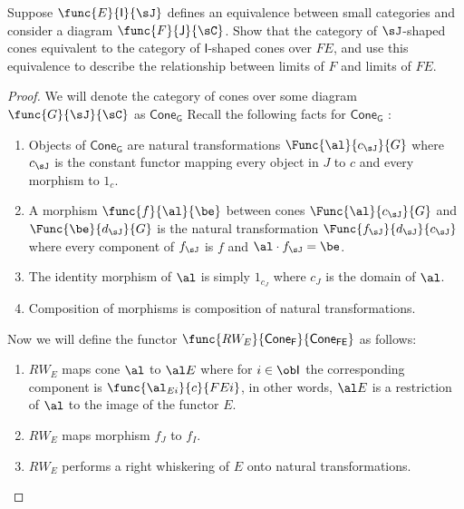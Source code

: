 \documentclass[../../main]{subfiles}
\begin{document}
\begin{exercise}
	Suppose $\func{E}{\mathsf{I}}{\sJ}$ defines an equivalence between
	small categories and consider a diagram $\func{F}{\mathsf{J}}{\sC}$.
	Show that the category of $\sJ$-shaped cones equivalent to the category
	of $\mathsf{I}$-shaped cones over $FE$, and use this equivalence to
	describe the relationship between limits of $F$ and limits of $FE$.
\end{exercise}

\begin{proof}
	We will denote the category of cones over some diagram $\func{G}{\sJ}{\sC}$
	as $\mathsf{Cone_{G}}$  Recall the following facts for $\mathsf{Cone_{G}}$ :
	\begin{enumerate}
		\item Objects of $\mathsf{Cone_{G}}$ are natural transformations
			$\Func{\al}{c_{\sJ} }{G}$ where $c_{\sJ}$ is the constant functor
			mapping every object in $J$ to $c$ and every morphism to $1_{c}$.

		\item A morphism $\func{f}{\al}{\be}$ between cones $\Func{\al}{c_{\sJ}
			}{G}$ and $\Func{\be}{d_{\sJ} }{G}$ is the natural transformation
			$\Func{ f_{\sJ} }{d_{\sJ}}{c_{\sJ}}$ where every component of $f_{\sJ}$ is
			$f$ and $\al \cdot f_{\sJ} = \be$.

		\item The identity morphism of $\al$ is simply $1_{c_J}$ where $c_{J}$ is
			the domain of $\al$.
		\item Composition of morphisms is composition of natural transformations.
	\end{enumerate}

	Now we will define the functor
	$\func{RW_{E}}{\mathsf{Cone_{F}}}{\mathsf{Cone_{FE}}}$ as follows:
	\begin{enumerate}
		\item $RW_{E}$ maps cone $\al$ to $\al E$ where for $i \in
			\ob\mathsf{I} $ the corresponding component is
			$\func{\al_{Ei}}{c}{FEi}$, in other words, $\al E$ is a restriction
			of $\al$ to the image of the functor $E$.
		\item $RW_{E}$ maps morphism $f_{J}$ to $f_{I}$.

		\item $RW_{E}$ performs a right whiskering of $E$ onto natural
			transformations.
	\end{enumerate}


\end{proof}
\end{document}
